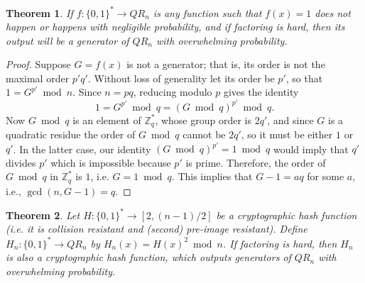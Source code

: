 \documentclass[a4paper,12pt]{article}
\newtheorem{theorem}{Theorem}
\newcommand{\Z}{\mathbb{Z}}
\begin{document}
\begin{theorem}
If $f: \{0,1\}^* \to QR_n$ is any function such that $f(x) = 1$ does not happen or happens with negligible probability, and if factoring is hard, then its output will be a generator of $QR_n$ with overwhelming probability.
\end{theorem}

\begin{proof}
Suppose $G = f(x)$ is not a generator; that is, its order is not the maximal order $p'q'$. Without loss of generality let its order be $p'$, so that $1 = G^{p'} \bmod n$. Since $n = pq$, reducing modulo $p$ gives the identity 
\[ 1 = G^{p'} \bmod q = (G \bmod q)^{p'} \bmod q. \]
Now $G \bmod q$ is an element of $\Z^*_q$, whose group order is $2q'$, and since $G$ is a quadratic residue the order of $G \bmod q$ cannot be $2q'$, so it must be either $1$ or $q'$. In the latter case, our identity $(G \bmod q)^{p'} = 1 \bmod q$ would imply that $q'$ divides $p'$ which is impossible because $p'$ is prime. Therefore, the order of $G \bmod q$ in $\Z^*_q$ is $1$, i.e. $G = 1 \bmod q$. This implies that $G - 1 = aq$ for some $a$, i.e., $\gcd(n, G-1) = q$.
\end{proof}

\begin{theorem}
Let $H: \{0,1\}^* \to [2, (n-1)/2]$ be a cryptographic hash function (i.e. it is collision resistant and (second) pre-image resistant). Define $H_n : \{0,1\}^* \to QR_n$ by $H_n(x) = H(x)^2 \bmod n$. If factoring is hard, then $H_n$ is also a cryptographic hash function, which outputs generators of $QR_n$ with overwhelming probability.
\end{theorem}
\end{document}
